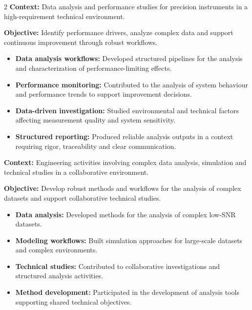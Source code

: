 \documentclass[8pt,a4paper,ragged2e,withhyper]{altacv}
\begin{document}
\begin{paracol}{2}
\textbf{Context:} Data analysis and performance studies for precision instruments in a high-requirement technical environment.

\textbf{Objective:} Identify performance drivers, analyze complex data and support continuous improvement through robust workflows.

\begin{itemize}
\item \textbf{Data analysis workflows:} Developed structured pipelines for the analysis and characterization of performance-limiting effects.
\item \textbf{Performance monitoring:} Contributed to the analysis of system behaviour and performance trends to support improvement decisions.
\item \textbf{Data-driven investigation:} Studied environmental and technical factors affecting measurement quality and system sensitivity.
\item \textbf{Structured reporting:} Produced reliable analysis outputs in a context requiring rigor, traceability and clear communication.
\end{itemize}

\divider


\textbf{Context:} Engineering activities involving complex data analysis, simulation and technical studies in a collaborative environment.

\textbf{Objective:} Develop robust methods and workflows for the analysis of complex datasets and support collaborative technical studies.

\begin{itemize}
\item \textbf{Data analysis:} Developed methods for the analysis of complex low-SNR datasets.
\item \textbf{Modeling workflows:} Built simulation approaches for large-scale datasets and complex environments.
\item \textbf{Technical studies:} Contributed to collaborative investigations and structured analysis activities.
\item \textbf{Method development:} Participated in the development of analysis tools supporting shared technical objectives.
\end{itemize}

\switchcolumn


\end{paracol}
\end{document}
